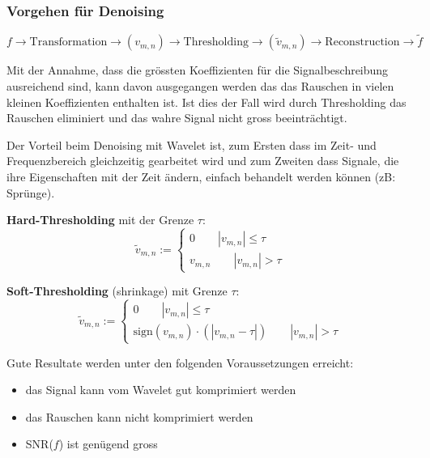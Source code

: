 \subsubsection{Vorgehen für Denoising}
\[ 
	f \longrightarrow \boxed{\mathrm{Transformation}} \longrightarrow (v_{m,n}) \longrightarrow \boxed{\mathrm{Thresholding}} \longrightarrow (\tilde{v}_{m,n}) \longrightarrow \boxed{\mathrm{Reconstruction}}\longrightarrow \tilde{f} 
\]

Mit der Annahme, dass die grössten Koeffizienten für die Signalbeschreibung ausreichend sind, kann davon ausgegangen werden das das Rauschen in vielen kleinen Koeffizienten enthalten ist. Ist dies der Fall wird durch Thresholding das Rauschen eliminiert und das wahre Signal nicht gross beeinträchtigt.

Der Vorteil beim Denoising mit Wavelet ist, zum Ersten dass im Zeit- und Frequenzbereich gleichzeitig gearbeitet wird und zum Zweiten dass Signale, die ihre Eigenschaften mit der Zeit ändern, einfach behandelt werden können (zB: Sprünge). 

\vspace{0.5cm}

\begin{minipage}[c]{0.5\textwidth}
	\textbf{Hard-Thresholding} mit der Grenze $\tau$:
	\[ \tilde{v}_{m,n} := \begin{cases} 0 \qquad |v_{m,n}| \leq \tau \\ v_{m,n} \qquad |v_{m,n}| > \tau \end{cases} \]
\end{minipage}
\begin{minipage}[c]{0.5\textwidth}
	\textbf{Soft-Thresholding} (shrinkage) mit Grenze $\tau$:
	\[ \tilde{v}_{m,n} := \begin{cases} 0 \qquad |v_{m,n}| \leq \tau \\ \mathrm{sign}(v_{m,n}) \cdot (|v_{m,n}-\tau|) \qquad |v_{m,n}| > \tau \end{cases} \]
\end{minipage}

Gute Resultate werden unter den folgenden Voraussetzungen erreicht:
\begin{itemize}
	\item das Signal kann vom Wavelet gut komprimiert werden
	\item das Rauschen kann nicht komprimiert werden
	\item SNR($f$) ist genügend gross
\end{itemize}


